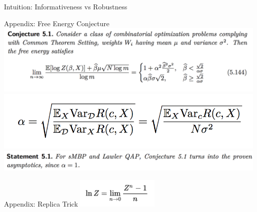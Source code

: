 \documentclass[presentation,12pt]{beamer}
\begin{document}
%   

\begin{frame}{Intuition: Informativeness vs Robustness}
  
\end{frame}

\begin{frame}{Appendix: Free Energy Conjecture}
  \centering
  \includegraphics[width=\textwidth]{conjecture_1.png} \\
  \includegraphics[width=.55\textwidth]{conjecture_2.png} \\
  \includegraphics[width=\textwidth]{conjecture_3.png}
\end{frame}

\begin{frame}{Appendix: Replica Trick}
  \centering
  \includegraphics[width=0.3\textwidth]{replica.png}
\end{frame}
\end{document}
